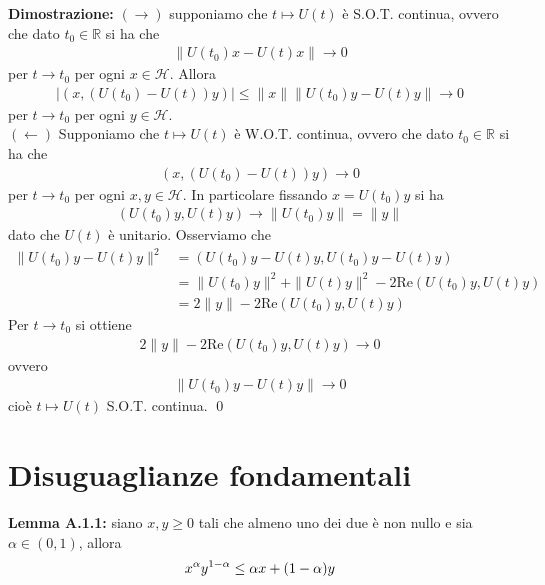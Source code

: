 \documentclass{article}
\numberwithin{equation}{subsection}
\begin{document}
\textbf{Dimostrazione:} $(\rightarrow)$ supponiamo che $t \mapsto U(t)$ è S.O.T. continua, ovvero che dato $t_0 \in \mathbb{R}$ si ha che
\begin{align*}
    \|U(t_0)x - U(t)x\| \rightarrow 0
\end{align*}
per $t \rightarrow t_0$ per ogni $x \in \mathcal{H}$. Allora
\begin{align*}
    |(x, (U(t_0) - U(t))y)| \leq \|x\|\|U(t_0)y - U(t)y\| \rightarrow 0
\end{align*}
per $t \rightarrow t_0$ per ogni $y \in \mathcal{H}$. \\
$(\leftarrow)$ Supponiamo che $t \mapsto U(t)$ è W.O.T. continua, ovvero che dato $t_0 \in \mathbb{R}$ si ha che
\begin{align*}
    (x, (U(t_0) - U(t))y) \rightarrow 0
\end{align*}
per $t \rightarrow t_0$ per ogni $x, y \in \mathcal{H}$. In particolare fissando $x = U(t_0)y$ si ha
\begin{align*}
    (U(t_0)y, U(t)y) \rightarrow \|U(t_0)y\| = \|y\|
\end{align*}
dato che $U(t)$ è unitario. Osserviamo che
\begin{align*}
    \|U(t_0)y - U(t)y\|^2 &= (U(t_0)y - U(t)y, U(t_0)y - U(t)y) \\
    &= \|U(t_0)y\|^2 + \|U(t)y\|^2 - 2\mathrm{Re}(U(t_0)y, U(t)y) \\
    &= 2\|y\| - 2\mathrm{Re}(U(t_0)y, U(t)y)
\end{align*}
Per $t \rightarrow t_0$ si ottiene
\begin{align*}
    2\|y\| - 2\mathrm{Re}(U(t_0)y, U(t)y) \rightarrow 0
\end{align*}
ovvero
\begin{align*}
    \|U(t_0)y - U(t)y\| \rightarrow 0
\end{align*}
cioè $t \mapsto U(t)$ S.O.T. continua. \qed



\appendix
\newpage
\section{Disuguaglianze fondamentali}
\textbf{Lemma A.1.1:} siano $x, y \geq 0$ tali che almeno uno dei due è non nullo e sia $\alpha \in (0, 1)$, allora 
\begin{align*}
    x^\alpha y^{1 - \alpha} \leq \alpha x + (1 - \alpha)y \notag
\end{align*} \\
\end{document}
